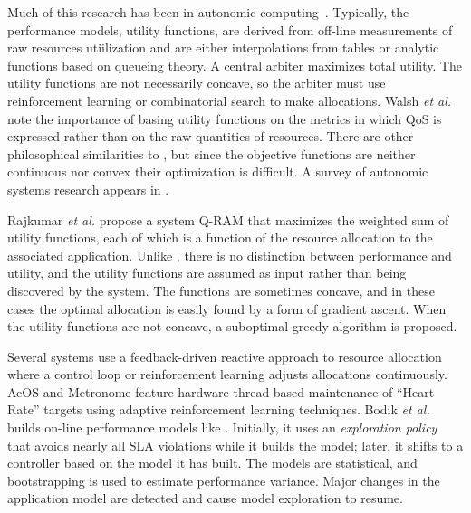 Much of this research has been in autonomic computing~\cite{1078472,1078493,1285843,1345325}. Typically, the performance models, utility functions, are derived from off-line measurements of raw resources utiilization and are either interpolations from tables or analytic functions based on queueing theory. 
A central arbiter maximizes total utility. The utility functions are not necessarily concave,
so the arbiter must use reinforcement learning or combinatorial search to make allocations.
Walsh \emph{et al.}\cite{1078411} note the importance of basing utility functions
on the metrics in which QoS is expressed rather than on the raw quantities of resources.
There are other philosophical similarities to \pacora, but since the objective functions are neither continuous nor convex their optimization is difficult. A survey of autonomic systems research appears in \cite{1380585}.

Rajkumar \emph{et al.}\cite{828990} propose a system Q-RAM that maximizes the weighted sum of utility functions, each of which is a function of the resource allocation to the associated application. Unlike \pacora, there is no distinction between performance and utility, and the utility functions are assumed as input rather than being discovered by the system. The functions are sometimes concave, and in these cases the optimal allocation is easily found by a form of gradient ascent. When the utility functions are not concave, a suboptimal greedy algorithm is proposed.

Several systems use a feedback-driven reactive approach to resource allocation where a control loop or reinforcement learning adjusts allocations continuously. AcOS\cite{AcOS} and Metronome\cite{Metronome} feature hardware-thread based maintenance of ``Heart Rate'' targets using adaptive reinforcement learning techniques.
Bodik \emph{et al.}\cite{bodik-acdc09} builds on-line performance models like \pacora.
Initially, it uses an \emph{exploration policy} that avoids nearly all SLA violations while it builds the model; later, it shifts to a controller based on the model it has built.
The models are statistical, and bootstrapping is used to estimate performance variance.
Major changes in the application model are detected and cause model exploration to resume.


